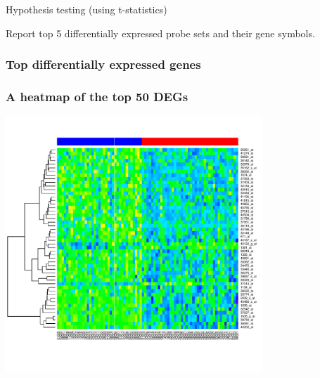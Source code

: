 \begin{frame}
Hypothesis testing (using t-statistics)
\begin{knitrout}\footnotesize
{}\color{fgcolor}\begin{kframe}
\begin{alltt}
 \hlkwb{<-}  \hlstd{)}
\end{alltt}
\end{kframe}
\end{knitrout}
Report top 5 differentially expressed probe sets and their gene symbols.
\begin{knitrout}\footnotesize
{}\color{fgcolor}\begin{kframe}
\begin{alltt}
 \hlkwb{<-} \hlstd{tt[}\hlstd{(tt[[}\hlstd{]]), ]}
 \hlkwb{<-} \hlstd{(tt.sorted)[}\hlopt{:}\hlstd{]}
\hlstd{(}\hlstd{)}
 \hlkwb{<-} \hlstd{(}\hlstd{(hgu95av2SYMBOL[top5]),tt.sorted[}\hlopt{:}\hlstd{,])}
\hlstd{(} \hlstd{=}\hlstd{)}
\end{alltt}
\end{kframe}
\end{knitrout}
\end{frame}

\begin{frame}
  \frametitle{Top differentially expressed genes}
  
\end{frame}


  

\begin{frame}[plain]
  \frametitle{A heatmap of the top 50 DEGs}
  \vspace{-.1in}
    \includegraphics[width=3.8in]{results/heatmap}
\end{frame}

